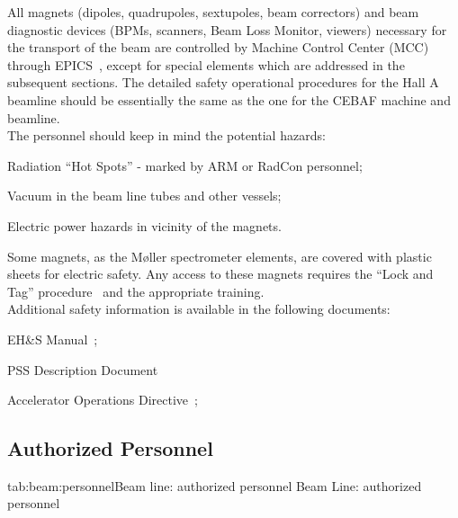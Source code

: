 All magnets (dipoles, quadrupoles, sextupoles, beam correctors) and beam 
diagnostic devices (BPMs, scanners, Beam Loss Monitor, viewers) necessary for 
the transport of the beam are controlled by Machine Control Center (MCC) 
through EPICS~\cite{EPICSwww}, except for special elements which are addressed in the 
subsequent sections. The detailed safety operational procedures for the Hall 
A beamline should be essentially the same as the one for the CEBAF machine 
and beamline.\\ 

\noindent{}The personnel should keep in mind the potential hazards:
\begin{list}{.~}{\setlength{\itemsep}{-0.15cm}}
  \item Radiation ``Hot Spots'' - marked by ARM or RadCon personnel;
  \item Vacuum in the beam line tubes and other vessels;
  \item Electric power hazards in vicinity of the magnets. 
\end{list}
Some magnets, as the M{\o}ller spectrometer elements, are covered with plastic
sheets for electric safety. Any access to these magnets requires
the ``Lock and Tag'' procedure~\cite{EHScebaf} and the appropriate training. \\

\noindent{}Additional safety information is available in the following documents:
\begin{list}{--}{\setlength{\itemsep}{-0.15cm}}
  \item EH\&S Manual~\cite{EHScebaf};
  \item PSS Description Document~\cite{PSScebaf}
  \item Accelerator Operations Directive~\cite{AODcebaf};
\end{list}

\begin{safetyen}{10}{10}
\section{ Authorized Personnel}
\end{safetyen}

\begin{namestab}{tab:beam:personnel}{Beam line: authorized personnel}{%
   Beam Line: authorized personnel}
\end{namestab}





